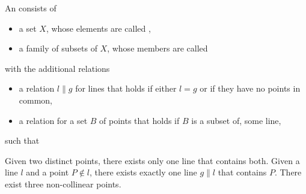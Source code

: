 \begin{definition}\label{def:affine_plane}
  An  consists of
  \begin{itemize}
    \item a set \( X \), whose elements are called ,
    \item a family of subsets of \( X \), whose members are called 
  \end{itemize}
  with the additional relations
  \begin{itemize}
    \item a  relation \( l \parallel g \) for lines that holds if either \( l = g \) or if they have no points in common,
    \item a  relation for a set \( B \) of points that holds if \( B \) is a subset of, some line,
  \end{itemize}
  such that
  \begin{thmenum}
     Given two distinct points, there exists only one line that contains both.
     Given a line \( l \) and a point \( P \not\in l \), there exists exactly one line \( g \parallel l \) that contains \( P \).
     There exist three non-collinear points.
  \end{thmenum}
\end{definition}

